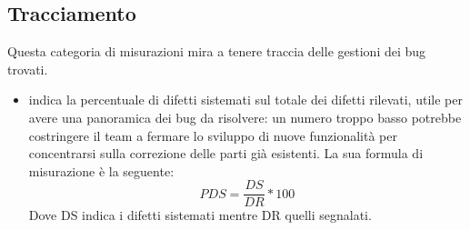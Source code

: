 \documentclass[PianoDiProgetto.tex]{subfiles}
\begin{document}
\subsection{Tracciamento}
Questa categoria di misurazioni mira a tenere traccia delle gestioni dei bug trovati.
\begin{itemize}
	\item {} indica la percentuale di difetti sistemati sul totale dei difetti rilevati, utile per avere una panoramica dei bug da risolvere: un numero troppo basso potrebbe costringere il team a fermare lo sviluppo di nuove funzionalità per concentrarsi sulla correzione delle parti già esistenti. La sua formula di misurazione è la seguente:
	\[PDS=\dfrac{DS}{DR}*100\]
	Dove DS indica i difetti sistemati mentre DR quelli segnalati.	
\end{itemize}
\end{document}
